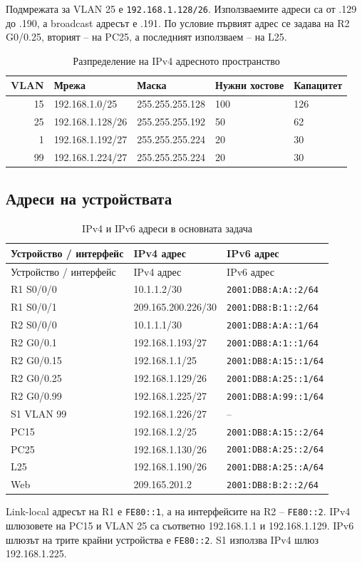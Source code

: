 \documentclass[12pt]{article}
\begin{document}
Подмрежата за VLAN 25 е \texttt{192.168.1.128/26}. Използваемите адреси са от .129 до .190, а broadcast адресът е .191. По условие първият адрес се задава на R2 G0/0.25, вторият -- на PC25, а последният използваем -- на L25.

\begin{table}[H]
\centering\small
\caption{Разпределение на IPv4 адресното пространство}
\begin{tabular}{rllll}
\toprule
VLAN & Мрежа & Маска & Нужни хостове & Капацитет\\
\midrule
15 & 192.168.1.0/25 & 255.255.255.128 & 100 & 126\\
25 & 192.168.1.128/26 & 255.255.255.192 & 50 & 62\\
1 & 192.168.1.192/27 & 255.255.255.224 & 20 & 30\\
99 & 192.168.1.224/27 & 255.255.255.224 & 20 & 30\\
\bottomrule
\end{tabular}
\end{table}

\subsection{Адреси на устройствата}
\begin{longtable}{p{3.5cm}p{4cm}p{7cm}}
\caption{IPv4 и IPv6 адреси в основната задача}\\
\toprule
Устройство / интерфейс & IPv4 адрес & IPv6 адрес\\\midrule\endfirsthead
\toprule Устройство / интерфейс & IPv4 адрес & IPv6 адрес\\\midrule\endhead
R1 S0/0/0 & 10.1.1.2/30 & \texttt{2001:DB8:A:A::2/64}\\
R1 S0/0/1 & 209.165.200.226/30 & \texttt{2001:DB8:B:1::2/64}\\
R2 S0/0/0 & 10.1.1.1/30 & \texttt{2001:DB8:A:A::1/64}\\
R2 G0/0.1 & 192.168.1.193/27 & \texttt{2001:DB8:A:1::1/64}\\
R2 G0/0.15 & 192.168.1.1/25 & \texttt{2001:DB8:A:15::1/64}\\
R2 G0/0.25 & 192.168.1.129/26 & \texttt{2001:DB8:A:25::1/64}\\
R2 G0/0.99 & 192.168.1.225/27 & \texttt{2001:DB8:A:99::1/64}\\
S1 VLAN 99 & 192.168.1.226/27 & --\\
PC15 & 192.168.1.2/25 & \texttt{2001:DB8:A:15::2/64}\\
PC25 & 192.168.1.130/26 & \texttt{2001:DB8:A:25::2/64}\\
L25 & 192.168.1.190/26 & \texttt{2001:DB8:A:25::A/64}\\
Web & 209.165.201.2 & \texttt{2001:DB8:B:2::2/64}\\
\bottomrule
\end{longtable}
Link-local адресът на R1 е \texttt{FE80::1}, а на интерфейсите на R2 -- \texttt{FE80::2}. IPv4 шлюзовете на PC15 и VLAN 25 са съответно 192.168.1.1 и 192.168.1.129. IPv6 шлюзът на трите крайни устройства е \texttt{FE80::2}. S1 използва IPv4 шлюз 192.168.1.225.
\end{document}
